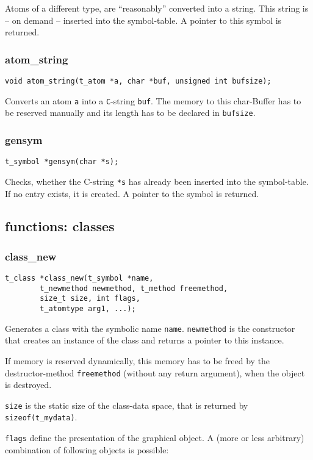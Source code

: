 \documentclass[12pt, a4paper,english,titlepage]{article}
\begin{document}
\begin{appendix}
Atoms of a different type, are ``reasonably'' converted into a string.
This string is -- on demand -- inserted into the symbol-table.
A pointer to this symbol is returned.

\subsubsection{atom\_string}
\begin{verbatim}
void atom_string(t_atom *a, char *buf, unsigned int bufsize);
\end{verbatim}
Converts an atom \verb+a+ into a {\tt C}-string \verb+buf+.
The memory to this char-Buffer has to be reserved manually and
its length has to be declared in \verb+bufsize+.

\subsubsection{gensym}
\begin{verbatim}
t_symbol *gensym(char *s);
\end{verbatim}
Checks, whether the C-string \verb+*s+ has already been inserted into the symbol-table.
If no entry exists, it is created.
A pointer to the symbol is returned.

\subsection{functions: classes}
\subsubsection{class\_new}
\begin{verbatim}
t_class *class_new(t_symbol *name,
        t_newmethod newmethod, t_method freemethod,
        size_t size, int flags,
        t_atomtype arg1, ...);
\end{verbatim}
Generates a class with the symbolic name \verb+name+.
\verb+newmethod+ is the constructor that creates an instance of the class and
returns a pointer to this instance.

If memory is reserved dynamically, this memory has to be freed by the
destructor-method \verb+freemethod+ (without any return argument),
when the object is destroyed.

\verb+size+  is the static size of the class-data space,
that is returned by \verb+sizeof(t_mydata)+.

\verb+flags+ define the presentation of the graphical object.
A (more or less arbitrary) combination of following objects is possible:


\end{appendix}
\end{document}
